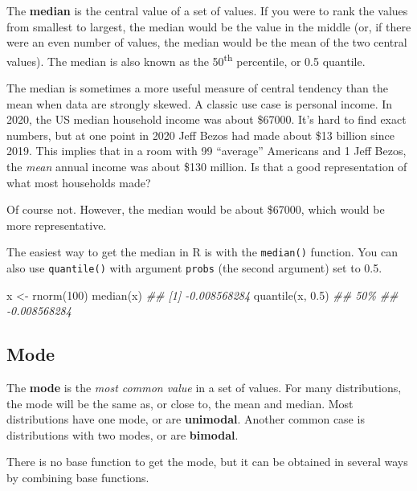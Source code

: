 \documentclass[
  13,
  letterpaper,
]{report}
\newenvironment{Shaded}{\begin{snugshade}}{\end{snugshade}}
\newcommand{\DecValTok}[1]{\textcolor[rgb]{0.68,0.00,0.00}{#1}}
\newcommand{\DocumentationTok}[1]{\textcolor[rgb]{0.37,0.37,0.37}{\textit{#1}}}
\newcommand{\FloatTok}[1]{\textcolor[rgb]{0.68,0.00,0.00}{#1}}
\newcommand{\FunctionTok}[1]{\textcolor[rgb]{0.28,0.35,0.67}{#1}}
\newcommand{\NormalTok}[1]{\textcolor[rgb]{0.00,0.23,0.31}{#1}}
\newcommand{\OtherTok}[1]{\textcolor[rgb]{0.00,0.23,0.31}{#1}}
\begin{document}
The \textbf{median} is the central value of a set of values. If you were
to rank the values from smallest to largest, the median would be the
value in the middle (or, if there were an even number of values, the
median would be the mean of the two central values). The median is also
known as the 50\textsuperscript{th} percentile, or 0.5 quantile.

The median is sometimes a more useful measure of central tendency than
the mean when data are strongly skewed. A classic use case is personal
income. In 2020, the US median household income was about \$67000. It's
hard to find exact numbers, but at one point in 2020 Jeff Bezos had made
about \$13 billion since 2019. This implies that in a room with 99
``average'' Americans and 1 Jeff Bezos, the \emph{mean} annual income
was about \$130 million. Is that a good representation of what most
households made?

Of course not. However, the median would be about \$67000, which would
be more representative.

The easiest way to get the median in R is with the \texttt{median()}
function. You can also use \texttt{quantile()} with argument
\texttt{probs} (the second argument) set to 0.5.

\begin{Shaded}
\begin{Highlighting}[]
\NormalTok{x }\OtherTok{\textless{}{-}} \FunctionTok{rnorm}\NormalTok{(}\DecValTok{100}\NormalTok{)}
\FunctionTok{median}\NormalTok{(x)}
\DocumentationTok{\#\# [1] {-}0.008568284}
\FunctionTok{quantile}\NormalTok{(x, }\FloatTok{0.5}\NormalTok{)}
\DocumentationTok{\#\#          50\% }
\DocumentationTok{\#\# {-}0.008568284}
\end{Highlighting}
\end{Shaded}

\subsection{Mode}\label{sec-06-cen-mode}

The \textbf{mode} is the \emph{most common value} in a set of values.
For many distributions, the mode will be the same as, or close to, the
mean and median. Most distributions have one mode, or are
\textbf{unimodal}. Another common case is distributions with two modes,
or are \textbf{bimodal}.

There is no base function to get the mode, but it can be obtained in
several ways by combining base functions.
\end{document}

